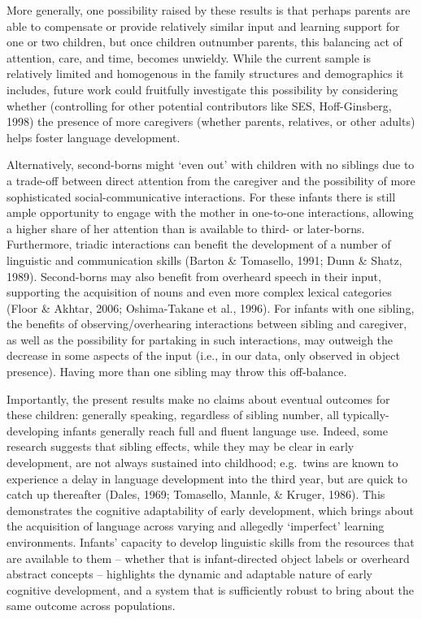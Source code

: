 \documentclass[
  english,
  man,floatsintext]{apa6}
\begin{document}
More generally, one possibility raised by these results is that perhaps parents are able to compensate or provide relatively similar input and learning support for one or two children, but once children outnumber parents, this balancing act of attention, care, and time, becomes unwieldy. While the current sample is relatively limited and homogenous in the family structures and demographics it includes, future work could fruitfully investigate this possibility by considering whether (controlling for other potential contributors like SES, Hoff-Ginsberg, 1998) the presence of more caregivers (whether parents, relatives, or other adults) helps foster language development.

Alternatively, second-borns might `even out' with children with no siblings due to a trade-off between direct attention from the caregiver and the possibility of more sophisticated social-communicative interactions. For these infants there is still ample opportunity to engage with the mother in one-to-one interactions, allowing a higher share of her attention than is available to third- or later-borns. Furthermore, triadic interactions can benefit the development of a number of linguistic and communication skills (Barton \& Tomasello, 1991; Dunn \& Shatz, 1989). Second-borns may also benefit from overheard speech in their input, supporting the acquisition of nouns and even more complex lexical categories (Floor \& Akhtar, 2006; Oshima-Takane et al., 1996). For infants with one sibling, the benefits of observing/overhearing interactions between sibling and caregiver, as well as the possibility for partaking in such interactions, may outweigh the decrease in some aspects of the input (i.e., in our data, only observed in object presence). Having more than one sibling may throw this off-balance.

Importantly, the present results make no claims about eventual outcomes for these children: generally speaking, regardless of sibling number, all typically-developing infants generally reach full and fluent language use. Indeed, some research suggests that sibling effects, while they may be clear in early development, are not always sustained into childhood; e.g.~twins are known to experience a delay in language development into the third year, but are quick to catch up thereafter (Dales, 1969; Tomasello, Mannle, \& Kruger, 1986). This demonstrates the cognitive adaptability of early development, which brings about the acquisition of language across varying and allegedly `imperfect' learning environments. Infants' capacity to develop linguistic skills from the resources that are available to them -- whether that is infant-directed object labels or overheard abstract concepts -- highlights the dynamic and adaptable nature of early cognitive development, and a system that is sufficiently robust to bring about the same outcome across populations.
\end{document}
